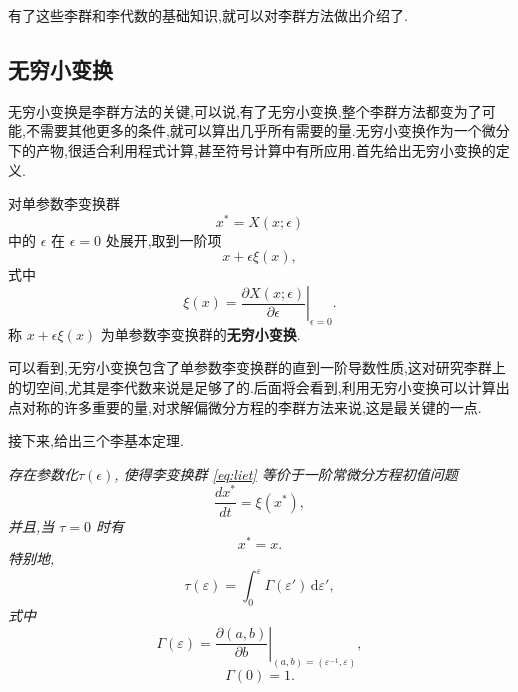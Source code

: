 有了这些李群和李代数的基础知识,就可以对李群方法做出介绍了.

\subsection{无穷小变换}
无穷小变换是李群方法的关键,可以说,有了无穷小变换,整个李群方法都变为了可能,不需要其他更多的条件,就可以算出几乎所有需要的量.无穷小变换作为一个微分下的产物,很适合利用程式计算,甚至符号计算中有所应用.首先给出无穷小变换的定义.


对单参数李变换群
\begin{equation}\label{eq:liet}
x^{*}=X(x;\epsilon)
\end{equation}
中的 $\epsilon$ 在 $\epsilon=0$ 处展开,取到一阶项
\begin{equation*}
x+\epsilon \xi(x),
\end{equation*}
式中
\begin{equation*}
\xi(x)=\left.\frac{\partial X(x;\epsilon)}{\partial \epsilon}\right|_{\epsilon=0}.
\end{equation*}
称 $x+\epsilon \xi(x)$ 为单参数李变换群的\textbf{无穷小变换}.

可以看到,无穷小变换包含了单参数李变换群的直到一阶导数性质,这对研究李群上的切空间,尤其是李代数来说是足够了的.后面将会看到,利用无穷小变换可以计算出点对称的许多重要的量,对求解偏微分方程的李群方法来说,这是最关键的一点.

接下来,给出三个李基本定理.
\begin{theorem}[李第一基本定理]
\emph{存在参数化$\tau(\epsilon)$, 使得李变换群 \eqref{eq:liet} 等价于一阶常微分方程初值问题
\begin{equation*}
\frac{dx^*}{dt}=\xi(x^*),
\end{equation*}
并且,当 $\tau=0$ 时有
\begin{equation*}
x^*=x.
\end{equation*}
特别地,
\begin{equation*}
\tau(\varepsilon)=\int_0^{\varepsilon}\Gamma(\varepsilon ')\,\mathrm{d}\varepsilon ',
\end{equation*}
式中
\begin{equation*}
\Gamma(\varepsilon)=\left.\frac{\partial(a,b)}{\partial b}\right|_{(a,b)=(\varepsilon^{-1},\varepsilon)},
\end{equation*}
\begin{equation*}
\Gamma(0)=1.
\end{equation*}}
\end{theorem}

